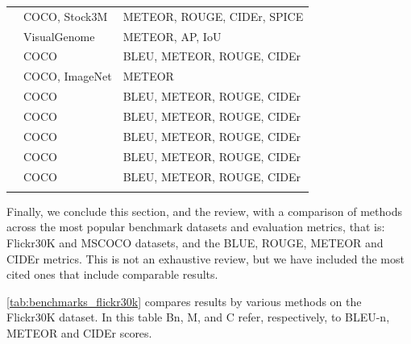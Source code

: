 \begin{longtable}{ p{} p{} p{} }
    \citet{Wang2017} & COCO, Stock3M & METEOR, ROUGE, CIDEr, SPICE \\
    \citet{Yang2017} & VisualGenome & METEOR, AP, IoU \\
    \citet{Yao2017_Attr} & COCO & BLEU, METEOR, ROUGE, CIDEr \\
    \citet{Yao2017_NOB} & COCO, ImageNet & METEOR \\
    \citet{Zhang2017} & COCO & BLEU, METEOR, ROUGE, CIDEr \\
    \citet{Aneja2018} & COCO & BLEU, METEOR, ROUGE, CIDEr \\
    \citet{Jiang2018} & COCO & BLEU, METEOR, ROUGE, CIDEr\\
    \citet{Khademi2018} & COCO & BLEU, METEOR, ROUGE, CIDEr\\
    \citet{Wang2018} & COCO & BLEU, METEOR, ROUGE, CIDEr \\
    \bottomrule
\label{tab:nn_methods_datasets_metrics}
\end{longtable}

Finally, we conclude this section, and the review, with a  comparison of methods across the most popular benchmark datasets and evaluation metrics, that is: Flickr30K and MSCOCO datasets, and the BLUE, ROUGE, METEOR and CIDEr metrics. This is not an exhaustive review, but we have included the most cited ones that include comparable results.

\cref{tab:benchmarks_flickr30k} compares results by various methods on the Flickr30K dataset. In this table Bn, M, and C refer, respectively, to BLEU-n, METEOR and CIDEr scores.

